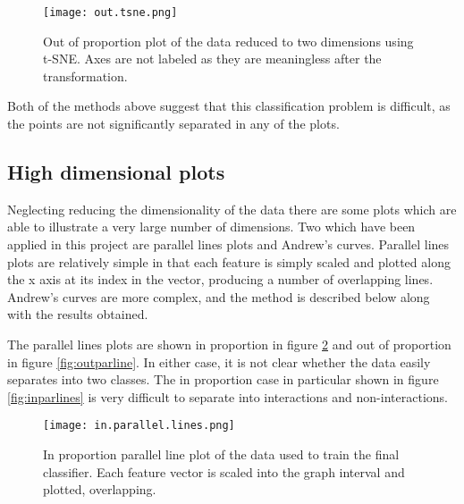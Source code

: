 \begin{figure}
    \texttt{[image: out.tsne.png]}
    \centering
    \caption{Out of proportion plot of the data reduced to two dimensions using t-SNE. Axes are not labeled as they are meaningless after the transformation.}
    \label{fig:outtsne}
\end{figure}

Both of the methods above suggest that this classification problem is difficult, as the points are not significantly separated in any of the plots.

\subsection{High dimensional plots}

Neglecting reducing the dimensionality of the data there are some plots which are able to illustrate a very large number of dimensions.
Two which have been applied in this project are parallel lines plots and Andrew's curves\autocite{andrews_plots_1972}.
Parallel lines plots are relatively simple in that each feature is simply scaled and plotted along the x axis at its index in the vector, producing a number of overlapping lines.
Andrew's curves are more complex, and the method is described below along with the results obtained.

The parallel lines plots are shown in proportion in figure \ref{fig:inparline} and out of proportion in figure \ref{fig:outparline}.
In either case, it is not clear whether the data easily separates into two classes.
The in proportion case in particular shown in figure \ref{fig:inparlines} is very difficult to separate into interactions and non-interactions.

\begin{figure}
    \texttt{[image: in.parallel.lines.png]}
    \centering
    \caption{In proportion parallel line plot of the data used to train the final classifier. Each feature vector is scaled into the graph interval and plotted, overlapping.}
    \label{fig:inparline}
\end{figure}


